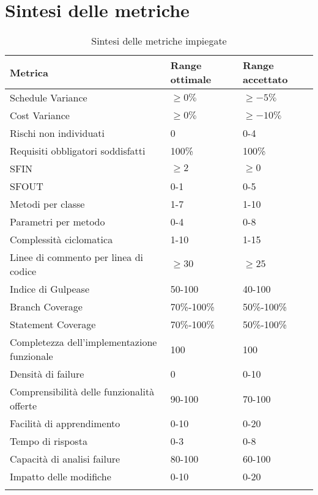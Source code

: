\section{Sintesi delle metriche}
\begin{longtable}[H]{|C{5cm}|C{3.5cm}|C{3.5cm}|}
		\hline
		\textbf{Metrica} & \textbf{Range ottimale} & \textbf{Range accettato}  \\ \hline
		Schedule Variance & $\geq0\%$ & $\geq-5\%$ \\ \hline
		Cost Variance & $\geq0\%$ & $\geq-10\%$ \\ \hline
		Rischi non individuati & 0 & 0-4 \\ \hline
		Requisiti obbligatori soddisfatti & 100\% & 100\% \\ \hline
		SFIN & $\geq 2$ & $\geq 0$ \\ \hline
		SFOUT & 0-1 & 0-5 \\ \hline
		Metodi per classe & 1-7 & 1-10 \\ \hline
		Parametri per metodo & 0-4 & 0-8 \\ \hline
		Complessità ciclomatica & 1-10 & 1-15 \\ \hline
		Linee di commento per linea di codice & $\geq30$ & $\geq25$ \\ \hline
		Indice di Gulpease & 50-100 & 40-100 \\ \hline
		Branch Coverage & 70\%-100\% & 50\%-100\% \\ \hline
		Statement Coverage & 70\%-100\% & 50\%-100\% \\ \hline
		Completezza dell'implementazione funzionale & 100 & 100 \\ \hline
		Densità di failure & 0 & 0-10 \\ \hline
		Comprensibilità delle funzionalità offerte & 90-100 & 70-100 \\ \hline
		Facilità di apprendimento & 0-10 & 0-20 \\ \hline
		Tempo di risposta & 0-3 & 0-8 \\ \hline
		Capacità di analisi failure & 80-100 & 60-100 \\ \hline
		Impatto delle modifiche & 0-10 & 0-20 \\ \hline
		\caption{Sintesi delle metriche impiegate}
\end{longtable}